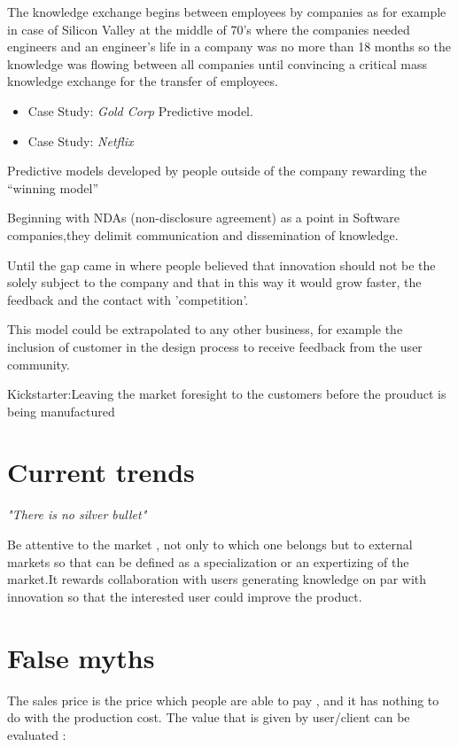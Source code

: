 The knowledge exchange begins between employees by companies
as for example in case of Silicon Valley at the middle of 70's where the
companies needed engineers and an engineer's life in a company was no more than
18 months so the knowledge was flowing between all companies until convincing a critical mass
knowledge exchange for the transfer of employees.

\begin{itemize}
  \item Case Study: \emph{Gold Corp} Predictive model.
  \item Case Study: \emph{Netflix}
\end{itemize}

Predictive models developed by people outside of the company rewarding the ``winning model''

Beginning with NDAs (non-disclosure agreement) as a point in Software
companies,they delimit communication and dissemination of knowledge. 

Until the gap came in where people believed that innovation should not be the
solely subject to the company and that in this way it would grow faster, the
feedback and the contact with 'competition'.

This model could be extrapolated to any other business, for example the
inclusion of customer in the design process to receive feedback from the user community.

Kickstarter:Leaving the market foresight to the customers before the prouduct is
being manufactured

\section{Current trends}\label{lesson-4-current-trends}

\emph{"There is no silver bullet"}

Be attentive to the market , not only to which one belongs but to external
markets so that can be defined as a specialization or an expertizing of the
market.It rewards collaboration with users generating knowledge on par with innovation
so that the interested user could improve the product.

\section{False myths}\label{lesson-4-false-myths}

The sales price is the price which people are able to pay , and it has nothing
to do with the production cost. 
The value that is given by user/client can be evaluated : 


